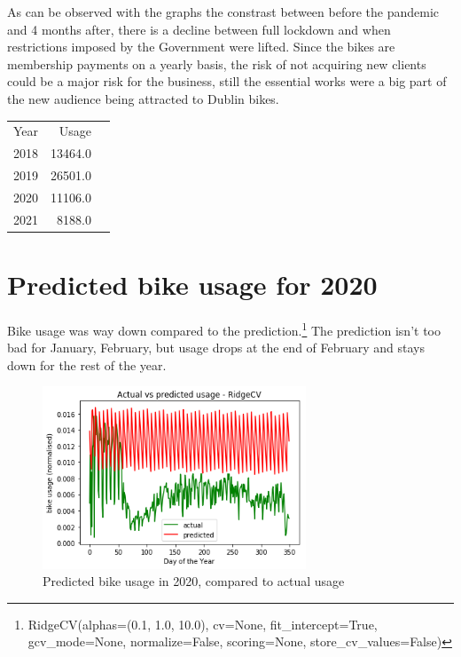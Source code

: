 \documentclass[11pt, singlecolumn, citestyle=authoryear]{elegantbook}
\begin{document}
As can be observed with the graphs the constrast between before the pandemic and  4 months after, there is a decline between full lockdown and when restrictions imposed by the Government were lifted. Since the bikes are membership payments on a yearly basis, the risk of not acquiring new clients could be a major risk for the business, still the essential works were a big part of the new audience being attracted to Dublin bikes. 

\begin{table}[h!]
	\begin{tabular}{|l|r|r|}
		Year & Usage \\
		2018 & 13464.0 \\
		2019 & 26501.0 \\ 
		2020 & 11106.0 \\ 
		2021 & 8188.0 \\ 
		
	\end{tabular} 
\end{table}

\section{Predicted bike usage for 2020}

Bike usage was way down compared to the prediction.\footnote{RidgeCV(alphas=(0.1, 1.0, 10.0), cv=None, fit\_intercept=True, gcv\_mode=None, normalize=False, scoring=None, store\_cv\_values=False)}  
The prediction isn't too bad for January, February, but usage drops at the end of February and stays down for the rest of the year.
\begin{figure}[!htbp]
	\includegraphics[width=0.7\textwidth]{../graphs/pred_2020.png}
	\caption{Predicted bike usage in 2020, compared to actual usage}
	\label{fig:surface}
\end{figure}
\end{document}
